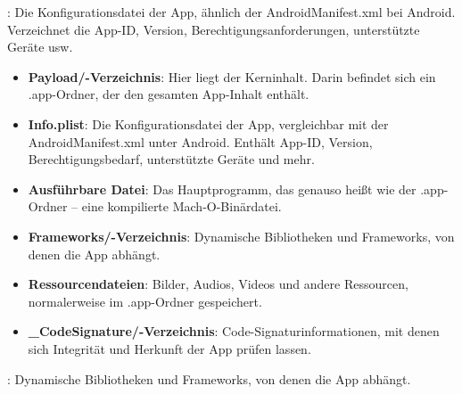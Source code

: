 
: Die Konfigurationsdatei der App, ähnlich der AndroidManifest.xml bei Android. Verzeichnet die App-ID, Version, Berechtigungsanforderungen, unterstützte Geräte usw.

\begin{itemize}
  \item \textbf{Payload/-Verzeichnis}: Hier liegt der Kerninhalt. Darin befindet sich ein .app-Ordner, der den gesamten App-Inhalt enthält.
  \item \textbf{Info.plist}: Die Konfigurationsdatei der App, vergleichbar mit der AndroidManifest.xml unter Android. Enthält App-ID, Version, Berechtigungsbedarf, unterstützte Geräte und mehr.
  \item \textbf{Ausführbare Datei}: Das Hauptprogramm, das genauso heißt wie der .app-Ordner – eine kompilierte Mach-O-Binärdatei.
  \item \textbf{Frameworks/-Verzeichnis}: Dynamische Bibliotheken und Frameworks, von denen die App abhängt.
  \item \textbf{Ressourcendateien}: Bilder, Audios, Videos und andere Ressourcen, normalerweise im .app-Ordner gespeichert.
  \item \textbf{\_CodeSignature/-Verzeichnis}: Code-Signaturinformationen, mit denen sich Integrität und Herkunft der App prüfen lassen.
\end{itemize}


: Dynamische Bibliotheken und Frameworks, von denen die App abhängt.

